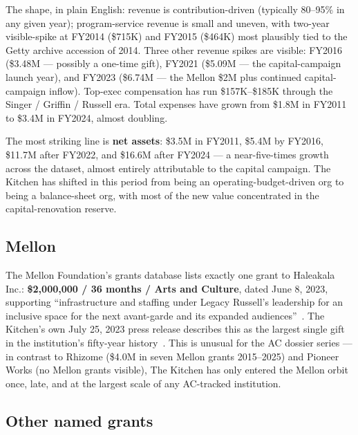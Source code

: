 \documentclass[10pt,letterpaper,twocolumn]{article}
\begin{document}
The shape, in plain English: revenue is contribution-driven (typically 80--95\% in any given year); program-service revenue is small and uneven, with two-year visible-spike at FY2014 (\$715K) and FY2015 (\$464K) most plausibly tied to the Getty archive accession of 2014. Three other revenue spikes are visible: FY2016 (\$3.48M --- possibly a one-time gift), FY2021 (\$5.09M --- the capital-campaign launch year), and FY2023 (\$6.74M --- the Mellon \$2M plus continued capital-campaign inflow). Top-exec compensation has run \$157K--\$185K through the Singer / Griffin / Russell era. Total expenses have grown from \$1.8M in FY2011 to \$3.4M in FY2024, almost doubling.

The most striking line is \textbf{net assets}: \$3.5M in FY2011, \$5.4M by FY2016, \$11.7M after FY2022, and \$16.6M after FY2024 --- a near-five-times growth across the dataset, almost entirely attributable to the capital campaign. The Kitchen has shifted in this period from being an operating-budget-driven org to being a balance-sheet org, with most of the new value concentrated in the capital-renovation reserve.

\subsection{Mellon}

The Mellon Foundation's grants database lists exactly one grant to Haleakala Inc.: \textbf{\$2{,}000{,}000 / 36 months / Arts and Culture}, dated June 8, 2023, supporting ``infrastructure and staffing under Legacy Russell's leadership for an inclusive space for the next avant-garde and its expanded audiences''~\citep{mellon_kitchen2023}. The Kitchen's own July 25, 2023 press release describes this as the largest single gift in the institution's fifty-year history~\citep{kitchen_mellon_press2023}. This is unusual for the AC dossier series --- in contrast to Rhizome (\$4.0M in seven Mellon grants 2015--2025) and Pioneer Works (no Mellon grants visible), The Kitchen has only entered the Mellon orbit once, late, and at the largest scale of any AC-tracked institution.

\subsection{Other named grants}
\end{document}
